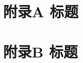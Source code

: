\appendix
\let\cleardoublepage\clearpage

\chapter{附录A 标题}
\label{app:A}


\chapter{附录B 标题}
\label{app:B}

